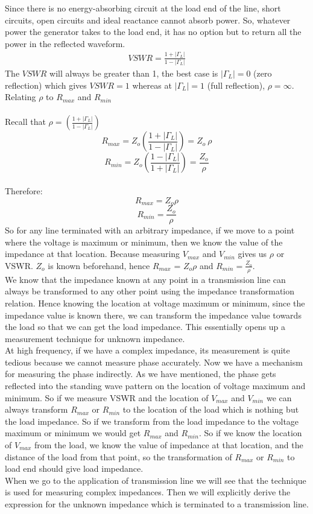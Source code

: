 Since there is no energy-absorbing circuit at the load end of the line, short circuits, open circuits and ideal reactance cannot absorb power. So, whatever power the generator takes to the load end, it has no option but to return all the power in the reflected waveform.
\begin{align*}
VSWR  = \frac{1+|\Gamma_L|}{1-|\Gamma_L|}
\end{align*}
The $VSWR$ will always be greater than 1, the best case is $|\Gamma_L|=0$ (zero reflection) which gives $VSWR=1$ whereas at $|\Gamma_L|=1$ (full reflection), $\rho= \infty$.
Relating $\rho$ to $R_{max}$ and  $R_{min}$\\\\
Recall that $\rho =  (\frac{1 + |\Gamma_L|}{1 - |\Gamma_L|})$
\begin{equation*}
R_{max}  = Z_o  (\frac{1 + |\Gamma_L|}{1 - |\Gamma_L|}) = Z_o    \  \rho
\end{equation*}
\begin{equation*}
R_{min}  = Z_o  (\frac{1 - |\Gamma_L|}{1 + |\Gamma_L|}) =\frac{Z_o}{\rho}
\end{equation*}
\\Therefore:
\begin{equation}
R_{max} = Z_o \rho
\end{equation}
\begin{equation}
R_{min} = \frac{Z_o}{\rho}
\end{equation}
So for any line terminated with an arbitrary impedance, if we move to a point where the voltage is maximum or minimum, then we know the value of the impedance at that location. Because measuring $V_{max}$ and $V_{min}$ gives us $\rho$ or VSWR. $Z_o$ is known beforehand, hence $R_{max}$ = $Z_o \rho$ and $R_{min} = \frac{Z_o}{\rho}$. \\
We know that the impedance known at any point in a transmission line can always be transformed to any other point using the impedance transformation relation. Hence knowing the location at voltage maximum or minimum, since the impedance value is known there, we can transform the impedance value towards the load so that we can get the load impedance. This essentially opens up a measurement technique for unknown impedance. \\
At high frequency, if we have a complex impedance, its measurement is quite tedious because we cannot measure phase accurately. Now we have a mechanism for measuring the phase indirectly. As we have mentioned, the phase gets reflected into the standing wave pattern on the location of voltage maximum and minimum. So if we measure VSWR and the location of $V_{max}$ and $V_{min}$ we can always transform $R_{max}$ or $R_{min}$ to the location of the load which is nothing but the load impedance. So if we transform from the load impedance to the voltage maximum or minimum we would get $R_{max}$ and $R_{min}$. So if we know the location of $V_{max}$ from the load, we know the value of impedance at that location, and the distance of the load from that point, so the transformation of $R_{max}$ or $R_{min}$ to load end should give load impedance.\\
When we go to the application of transmission line we will see that the technique is used for measuring complex impedances. Then we will explicitly derive the expression for the unknown impedance which is terminated to a transmission line. 